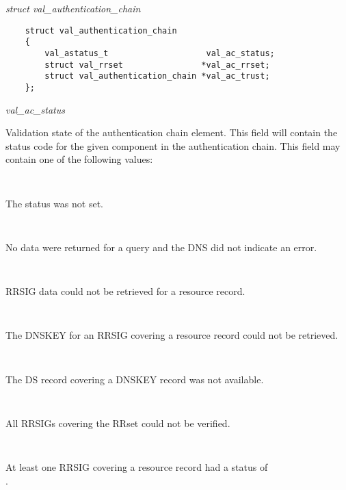 \begin{description}

\item {\it struct val\_authentication\_chain}\verb" "

\begin{verbatim}
    struct val_authentication_chain
    {
        val_astatus_t                    val_ac_status;
        struct val_rrset                *val_ac_rrset;
        struct val_authentication_chain *val_ac_trust;
    };
\end{verbatim}

\begin{description}

\item {\it val\_ac\_status} \verb" "

Validation state of the authentication chain element.  This field will
contain the status code for the given component in the authentication chain.
This field may contain one of the following values:

\begin{description}
\item {}\verb" "

The status was not set.

\item {}\verb" "

No data were returned for a query and the DNS did not
indicate an error.

\item {}\verb" "

RRSIG data could not be retrieved for a resource record.

\item {}\verb" "

The DNSKEY for an RRSIG covering a resource record
could not be retrieved.

\item {}\verb" "

The DS record covering a DNSKEY record was not available.

\item {}\verb" "

All RRSIGs covering the RRset could not be verified.

\item {}\verb" "

At least one RRSIG covering a resource record had a status of\\
.


\end{description}
\end{description}
\end{description}
